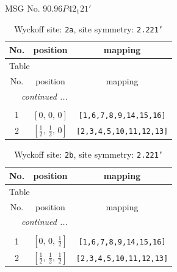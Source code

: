 \documentclass[fleqn,8pt]{jsarticle}
\begin{document}
\setcounter{MaxMatrixCols}{32}

\renewcommand{\tablename}{Table~}
\renewcommand{\figurename}{Figure~}
\begin{center}
\LARGE
MSG No. 90.96\quad$P42_{1}21'$
\end{center}
\renewcommand{\arraystretch}{1.2}
\begin{longtable}{ccc}
\caption{Wyckoff site: {\tt 2a}, site symmetry: {\tt 2.221'}}
 \\
 \hline \hline
No. & position & mapping \\ \hline \endfirsthead

\multicolumn{2}{l}{\tablename\ \thetable{}} \\
 \hline \hline
No. & position & mapping \\ \hline \endhead

 \hline \hline
\multicolumn{2}{r}{\footnotesize\it continued ...} \\ \endfoot

 \hline \hline
\multicolumn{2}{r}{} \\ \endlastfoot

1 & $\left[ 0,\, 0,\, 0 \right]$ & {\tt [1,6,7,8,9,14,15,16]} \\ \hline
2 & $\left[ \frac{1}{2},\, \frac{1}{2},\, 0 \right]$ & {\tt [2,3,4,5,10,11,12,13]} \\
\end{longtable}
\renewcommand{\arraystretch}{1.2}
\begin{longtable}{ccc}
\caption{Wyckoff site: {\tt 2b}, site symmetry: {\tt 2.221'}}
 \\
 \hline \hline
No. & position & mapping \\ \hline \endfirsthead

\multicolumn{2}{l}{\tablename\ \thetable{}} \\
 \hline \hline
No. & position & mapping \\ \hline \endhead

 \hline \hline
\multicolumn{2}{r}{\footnotesize\it continued ...} \\ \endfoot

 \hline \hline
\multicolumn{2}{r}{} \\ \endlastfoot

1 & $\left[ 0,\, 0,\, \frac{1}{2} \right]$ & {\tt [1,6,7,8,9,14,15,16]} \\ \hline
2 & $\left[ \frac{1}{2},\, \frac{1}{2},\, \frac{1}{2} \right]$ & {\tt [2,3,4,5,10,11,12,13]} \\
\end{longtable}
\end{document}
